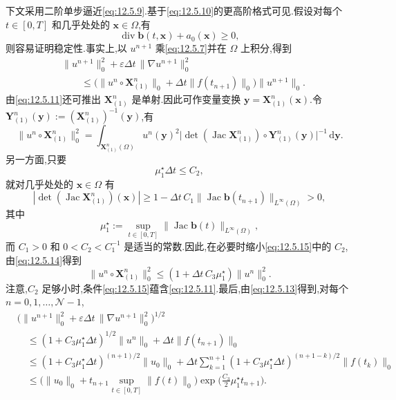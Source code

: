 下文采用二阶单步逼近\eqref{eq:12.5.9}.基于\eqref{eq:12.5.10}的更高阶格式可见.假设对每个 \(t\in[0,T]\) 和几乎处处的 \(\boldsymbol{x}\in\Omega\),有
\begin{equation}\label{eq:12.5.12}
  \operatorname{div}\boldsymbol{b}(t,\boldsymbol{x})+a_0(\boldsymbol{x})\ge0,
\end{equation}
则容易证明稳定性.事实上,以 \(u^{n+1}\) 乘\eqref{eq:12.5.7}并在 \(\Omega\) 上积分,得到
\begin{equation}\label{eq:12.5.13}
  \begin{aligned}
    &\|u^{n+1}\|_0^2+\varepsilon\Delta t\,\|\nabla u^{n+1}\|_0^2\\
    &\qquad\le\bigl(\|u^n\circ\boldsymbol{X}_{(1)}^n\|_0+\Delta t\|f(t_{n+1})\|_0\bigr)
          \|u^{n+1}\|_0.
  \end{aligned}
\end{equation}
由\eqref{eq:12.5.11}还可推出 \(\boldsymbol{X}_{(1)}^n\) 是单射.因此可作变量变换 \(\boldsymbol{y}=\boldsymbol{X}_{(1)}^n(\boldsymbol{x})\).令 \(\boldsymbol{Y}_{(1)}^n(\boldsymbol{y}):=(\boldsymbol{X}_{(1)}^n)^{-1}(\boldsymbol{y})\),有
\begin{equation}\label{eq:12.5.14}
  \|u^n\circ\boldsymbol{X}_{(1)}^n\|_0^2
    =\int_{\boldsymbol{X}_{(1)}^n(\Omega)}u^n(\boldsymbol{y})^2
       \bigl|\det(\operatorname{Jac}\boldsymbol{X}_{(1)}^n)
             \circ\boldsymbol{Y}_{(1)}^n(\boldsymbol{y})\bigr|^{-1}\,\mathrm d\boldsymbol{y}.
\end{equation}
另一方面,只要
\begin{equation}\label{eq:12.5.15}
  \mu_1^\star\Delta t\le C_2,
\end{equation}
就对几乎处处的 \(\boldsymbol{x}\in\Omega\) 有
\[
  |\det(\operatorname{Jac}\boldsymbol{X}_{(1)}^n)(\boldsymbol{x})|
    \ge1-\Delta t\,C_1\|\operatorname{Jac}\boldsymbol{b}(t_{n+1})\|_{L^\infty(\Omega)}>0,
\]
其中
\[
  \mu_1^\star:=\sup_{t\in[0,T]}
    \|\operatorname{Jac}\boldsymbol{b}(t)\|_{L^\infty(\Omega)},
\]
而 \(C_1>0\) 和 \(0<C_2<C_1^{-1}\) 是适当的常数.因此,在必要时缩小\eqref{eq:12.5.15}中的 \(C_2\),由\eqref{eq:12.5.14}得到
\begin{equation}\label{eq:12.5.16}
  \|u^n\circ\boldsymbol{X}_{(1)}^n\|_0^2\le(1+\Delta t\,C_3\mu_1^\star)\|u^n\|_0^2.
\end{equation}
注意,\(C_2\) 足够小时,条件\eqref{eq:12.5.15}蕴含\eqref{eq:12.5.11}.最后,由\eqref{eq:12.5.13}得到,对每个 \(n=0,1,\ldots,\mathcal N-1\),
\begin{equation}\label{eq:12.5.17}
  \begin{aligned}
    &\bigl(\|u^{n+1}\|_0^2+\varepsilon\Delta t\,\|\nabla u^{n+1}\|_0^2\bigr)^{1/2}\\
    &\quad\le(1+C_3\mu_1^\star\Delta t)^{1/2}\|u^n\|_0
            +\Delta t\|f(t_{n+1})\|_0\\
    &\quad\le(1+C_3\mu_1^\star\Delta t)^{(n+1)/2}\|u_0\|_0
       +\Delta t\sum_{k=1}^{n+1}(1+C_3\mu_1^\star\Delta t)^{(n+1-k)/2}\|f(t_k)\|_0\\
    &\quad\le\biggl(\|u_0\|_0+t_{n+1}\sup_{t\in[0,T]}\|f(t)\|_0\biggr)
        \exp\biggl(\frac{C_3}{2}\mu_1^\star t_{n+1}\biggr).
  \end{aligned}
\end{equation}
